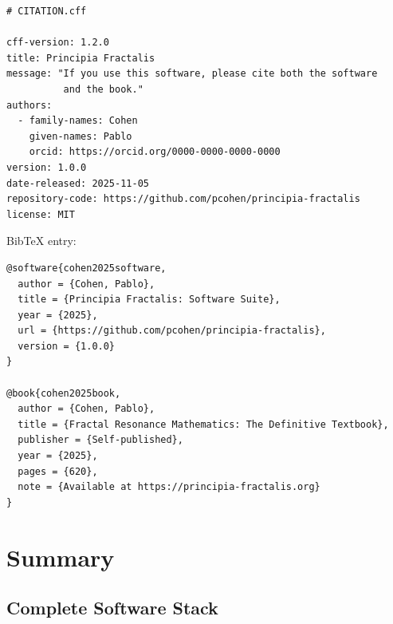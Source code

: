 \begin{verbatim}
# CITATION.cff

cff-version: 1.2.0
title: Principia Fractalis
message: "If you use this software, please cite both the software
          and the book."
authors:
  - family-names: Cohen
    given-names: Pablo
    orcid: https://orcid.org/0000-0000-0000-0000
version: 1.0.0
date-released: 2025-11-05
repository-code: https://github.com/pcohen/principia-fractalis
license: MIT
\end{verbatim}

BibTeX entry:
\begin{verbatim}
@software{cohen2025software,
  author = {Cohen, Pablo},
  title = {Principia Fractalis: Software Suite},
  year = {2025},
  url = {https://github.com/pcohen/principia-fractalis},
  version = {1.0.0}
}

@book{cohen2025book,
  author = {Cohen, Pablo},
  title = {Fractal Resonance Mathematics: The Definitive Textbook},
  publisher = {Self-published},
  year = {2025},
  pages = {620},
  note = {Available at https://principia-fractalis.org}
}
\end{verbatim}

\section{Summary}
\label{sec:summary-ch31}

\subsection{Complete Software Stack}

